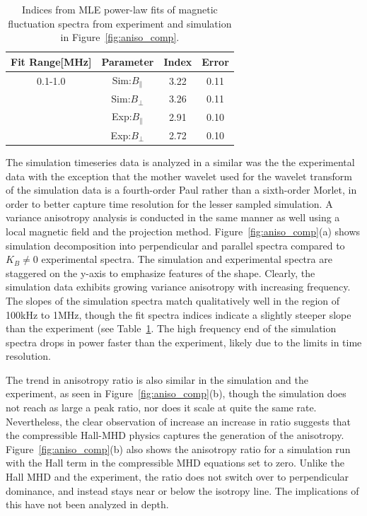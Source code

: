 \documentclass[aip,prl,amsmath,amssymb,reprint,superscriptaddress]{revtex4-1} %
\begin{document}
\begin{table}
\caption{\label{tab:Simindices}Indices from MLE power-law fits of magnetic fluctuation spectra from experiment and simulation in Figure~\ref{fig:aniso_comp}.}
\begin{tabular}{cccc}
\toprule
Fit Range[MHz]	&	Parameter						&	Index	&Error\\
\hline
0.1-1.0					& Sim:$B_{\parallel}$	& 3.22	&0.11\\
								& Sim:$B_{\perp}$			& 3.26  &0.11\\
								& Exp:$B_{\parallel}$	& 2.91	&0.10\\
								& Exp:$B_{\perp}$			& 2.72  &0.10\\
\hline
\end{tabular}
\end{table}

The simulation timeseries data is analyzed in a similar was the the experimental data with the exception that the mother wavelet used for the wavelet transform of the simulation data is a fourth-order Paul rather than a sixth-order Morlet, in order to better capture time resolution for the lesser sampled simulation. A variance anisotropy analysis is conducted in the same manner as well using a local magnetic field and the projection method. Figure~\ref{fig:aniso_comp}(a) shows simulation decomposition into perpendicular and parallel spectra compared to $K_{B}\neq 0$ experimental spectra. The simulation and experimental spectra are staggered on the y-axis to emphasize features of the shape. Clearly, the simulation data exhibits growing variance anisotropy with increasing frequency. The slopes of the simulation spectra match qualitatively well in the region of 100kHz to 1MHz, though the fit spectra indices indicate a slightly steeper slope than the experiment (see Table~\ref{tab:Simindices}. The high frequency end of the simulation spectra drops in power faster than the experiment, likely due to the limits in time resolution.

The trend in anisotropy ratio is also similar in the simulation and the experiment, as seen in Figure~\ref{fig:aniso_comp}(b), though the simulation does not reach as large a peak ratio, nor does it scale at quite the same rate. Nevertheless, the clear observation of increase an increase in ratio suggests that the compressible Hall-MHD physics captures the generation of the anisotropy. Figure~\ref{fig:aniso_comp}(b) also shows the anisotropy ratio for a simulation run with the Hall term in the compressible MHD equations set to zero. Unlike the Hall MHD and the experiment, the ratio does not switch over to perpendicular dominance, and instead stays near or below the isotropy line. The implications of this have not been analyzed in depth.
\end{document}
